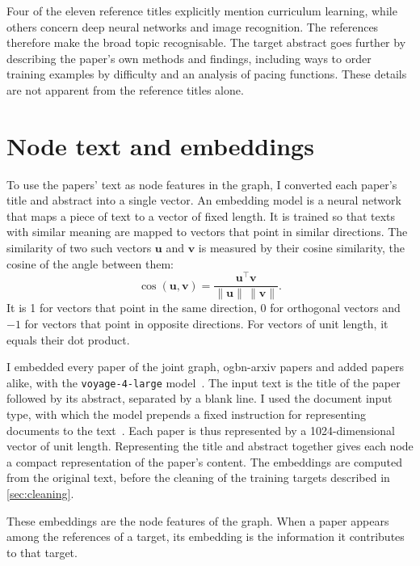 Four of the eleven reference titles explicitly mention curriculum learning, while others concern deep neural networks and image recognition. The references therefore make the broad topic recognisable. The target abstract goes further by describing the paper's own methods and findings, including ways to order training examples by difficulty and an analysis of pacing functions. These details are not apparent from the reference titles alone.

\newpage
\section{Node text and embeddings}
\label{sec:embeddings}

To use the papers' text as node features in the graph, I converted each paper's title and abstract into a single vector. An embedding model is a neural network that maps a piece of text to a vector of fixed length. It is trained so that texts with similar meaning are mapped to vectors that point in similar directions. The similarity of two such vectors $\mathbf{u}$ and $\mathbf{v}$ is measured by their cosine similarity, the cosine of the angle between them:
\[
  \cos(\mathbf{u}, \mathbf{v}) = \frac{\mathbf{u}^\top \mathbf{v}}{\lVert \mathbf{u} \rVert \, \lVert \mathbf{v} \rVert}.
\]
It is 1 for vectors that point in the same direction, 0 for orthogonal vectors and $-1$ for vectors that point in opposite directions. For vectors of unit length, it equals their dot product.

I embedded every paper of the joint graph, ogbn-arxiv papers and added papers alike, with the \texttt{voyage-4-large} model~\cite{voyage2026voyage4}. The input text is the title of the paper followed by its abstract, separated by a blank line. I used the document input type, with which the model prepends a fixed instruction for representing documents to the text~\cite{voyage2026embeddings}. Each paper is thus represented by a 1024-dimensional vector of unit length. Representing the title and abstract together gives each node a compact representation of the paper's content. The embeddings are computed from the original text, before the cleaning of the training targets described in \autoref{sec:cleaning}.

These embeddings are the node features of the graph. When a paper appears among the references of a target, its embedding is the information it contributes to that target.

